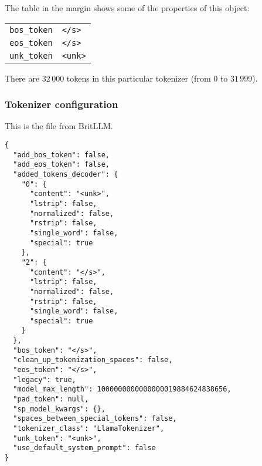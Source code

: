 \documentclass[11pt, a4paper]{article}
\begin{document}
The table in the margin shows some of the properties of this object:
\begin{margintable}
\begin{tabular}{ll}
  \toprule
  \verb|bos_token| & \verb|</s>| \\
  \verb|eos_token| & \verb|</s>| \\
  \verb|unk_token| & \verb|<unk>| \\
  \bottomrule
\end{tabular}
\end{margintable}

                      
                      
                       
                      
  
There are $32\,000$ tokens in this particular tokenizer (from $0$ to $31\,999$). 

\subsubsection{Tokenizer configuration}

This is the file  from BritLLM\@.
{\small
\begin{verbatim}
{
  "add_bos_token": false,
  "add_eos_token": false,
  "added_tokens_decoder": {
    "0": {
      "content": "<unk>",
      "lstrip": false,
      "normalized": false,
      "rstrip": false,
      "single_word": false,
      "special": true
    },
    "2": {
      "content": "</s>",
      "lstrip": false,
      "normalized": false,
      "rstrip": false,
      "single_word": false,
      "special": true
    }
  },
  "bos_token": "</s>",
  "clean_up_tokenization_spaces": false,
  "eos_token": "</s>",
  "legacy": true,
  "model_max_length": 1000000000000000019884624838656,
  "pad_token": null,
  "sp_model_kwargs": {},
  "spaces_between_special_tokens": false,
  "tokenizer_class": "LlamaTokenizer",
  "unk_token": "<unk>",
  "use_default_system_prompt": false
}
\end{verbatim}}
\end{document}
